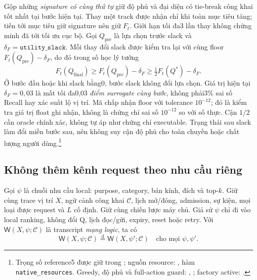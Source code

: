 Gộp những \emph{signature có cùng thứ tự} giữ độ phủ và đại diện có
tie-break công khai tốt nhất tại bước hiện tại. Thay một track được nhận
chỉ khi toàn mục tiêu tăng; tiến tới mục tiêu giữ signature nên giữ
$F_t$. Giới hạn tối đa3 lần thay không chứng minh đã tới tối ưu cục bộ.
Gọi $Q_{\mathrm{pre}}$ là lựa chọn trước slack và
$\delta_F=\texttt{utility\_slack}$. Mỗi thay đổi slack được kiểm tra lại
với cùng floor $F_t(Q_{\mathrm{pre}})-\delta_F$, do đó trong số học lý
tưởng
\begin{equation}
 F_t(Q_{\mathrm{final}})\geq F_t(Q_{\mathrm{pre}})-\delta_F
 \geq\tfrac12F_t(Q^*)-\delta_F.
 \label{eq:formal-service-slack-floor}
\end{equation}
Ở bước đầu hoặc khi slack bằng0, bước slack không đổi lựa chọn. Giá trị
hiện tại $\delta_F=0{,}03$ là mất tối đa0,03 \emph{điểm surrogate cùng
bước}, không phải3\% sai số Recall hay xác suất lộ vị trí. Mã chấp nhận
floor với tolerance $10^{-12}$; đó là kiểm tra giá trị float ghi nhận,
không là chứng chỉ sai số $10^{-12}$ so với số thực. Cận $1/2$ cần oracle
chính xác, không tự áp như chứng chỉ executable. Trạng thái sau slack
làm đổi miền bước sau, nên không suy cận độ phủ cho toàn chuyến hoặc
chất lượng người dùng.\footnote{Trọng số reference5 được giữ trong
; nguồn resource:
, hàm \texttt{native\_resources}.
Greedy, độ phủ và full-action guard:
,
; factory active:
.}

\subsection{Không thêm kênh request theo nhu cầu riêng}
\label{sec:formal-service-noninterference}

Gọi $\psi$ là chuỗi nhu cầu local: purpose, category, bán kính, đích và
top-$k$. Giữ cùng trace vị trí $X$, ngữ cảnh công khai $\mathcal C$, lịch
mở/đóng, admission, sự kiện, mọi loại được request và $L$ cố định. Giữ
cùng chiến lược máy chủ. Giả sử $\psi$ chỉ đi vào local ranking, không
đổi Q, lịch đọc/gửi, expiry, reset hoặc retry. Với
$\mathsf W(X,\psi;\mathcal C)$ là transcript \emph{mạng logic}, ta có
\begin{equation}
 \mathsf W(X,\psi;\mathcal C)
 \overset{\mathrm d}{=}
 \mathsf W(X,\psi';\mathcal C)
 \quad\text{cho mọi }\psi,\psi'.
 \label{eq:current-purpose-noninterference}
\end{equation}

